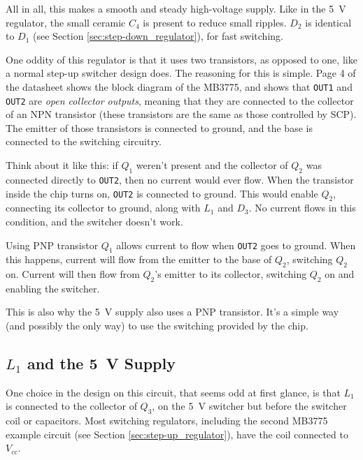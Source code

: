\documentclass{article}
\newcommand{\Vcc}{$V_{cc}$}
\newcommand{\chippin}{\texttt}
\newcommand{\model}{\textsf}
\begin{document}
All in all, this makes a smooth and steady high-voltage supply. Like
in the \qty{5}{\volt} regulator, the small ceramic $C_4$ is present to
reduce small ripples. $D_2$ is identical to $D_1$ (see Section
\ref{sec:step-down_regulator}), for fast switching.

One oddity of this regulator is that it uses two transistors, as
opposed to one, like a normal step-up switcher design does. The
reasoning for this is simple. Page 4 of the datasheet shows the block
diagram of the \model{MB3775}, and shows that \chippin{OUT1} and
\chippin{OUT2} are \textit{open collector outputs}, meaning that they
are connected to the collector of an NPN transistor (these transistors
are the same as those controlled by SCP). The emitter of those
transistors is connected to ground, and the base is connected to the
switching circuitry.

Think about it like this: if $Q_1$ weren't present and the collector
of $Q_2$ was connected directly to \chippin{OUT2}, then no current
would ever flow. When the transistor inside the chip turns on,
\chippin{OUT2} is connected to ground. This would enable $Q_2$,
connecting its collector to ground, along with $L_1$ and $D_3$. No
current flows in this condition, and the switcher doesn't work.

Using PNP transistor $Q_1$ allows current to flow when \chippin{OUT2}
goes to ground. When this happens, current will flow from the emitter
to the base of $Q_2$, switching $Q_2$ on. Current will then flow from
$Q_2$'s emitter to its collector, switching $Q_2$ on and enabling the
switcher.

This is also why the \qty{5}{\volt} supply also uses a PNP
transistor. It's a simple way (and possibly the only way) to use the
switching provided by the chip.


\subsection{$L_1$ and the \qty{5}{\volt} Supply}
One choice in the design on this circuit, that seems odd at first
glance, is that $L_1$ is connected to the collector of $Q_3$, on the
\qty{5}{\volt} switcher but before the switcher coil or
capacitors. Most switching regulators, including the second
\model{MB3775} example circuit (see Section
\ref{sec:step-up_regulator}), have the coil connected to \Vcc{}.
\end{document}
